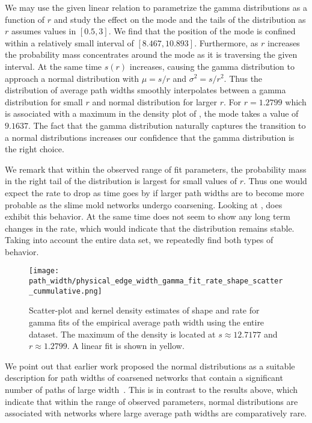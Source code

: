 		We may use the given linear relation to parametrize the gamma distributions as a function of $r$ and study the effect on the mode and the tails of the distribution as $r$ assumes values in $[0.5,3]$. We find that the position of the mode is confined within a relatively small interval of $[8.467,10.893]$. Furthermore, as $r$ increases the probability mass concentrates around the mode as it is traversing the given interval. At the same time $s(r)$ increases, causing the gamma distribution to approach a normal distribution with $\mu = s/r$ and $\sigma^2= s/r^2$. Thus the distribution of average path widths smoothly interpolates between a gamma distribution for small $r$ and normal distribution for larger $r$. For $r = 1.2799$ which is associated with a maximum in the density plot of , the mode takes a value of $9.1637$. The fact that the gamma distribution naturally captures the transition to a normal distributions increases our confidence that the gamma distribution is the right choice.

		We remark that within the observed range of fit parameters, the probability mass in the right tail of the distribution is largest for small values of $r$. Thus one would expect the rate to drop as time goes by if larger path widths are to become more probable as the slime mold networks undergo coarsening. Looking at ,  does exhibit this behavior. At the same time  does not seem to show any long term changes in the rate, which would indicate that the distribution remains stable. Taking into account the entire data set, we repeatedly find both types of behavior.

		\begin{figure}[!htbp]
			\centering
				\texttt{[image: path\_width/physical\_edge\_width\_gamma\_fit\_rate\_shape\_scatter\_cummulative.png]}
			\caption[Path width distribution fit parameter densities.]{Scatter-plot and kernel density estimates of shape and rate for gamma fits of the empirical average path width using the entire dataset. The maximum of the density is located at $s \approx 12.7177$ and $r \approx 1.2799$. A linear fit is shown in yellow.}
			\label{fig:path_widths_gamma_fit_kde}
		\end{figure}

		We point out that earlier work proposed the normal distributions as a suitable description for path widths of coarsened networks that contain a significant number of paths of large width~\cite{baumgarten2010plasmodial}. This is in contrast to the results above, which indicate that within the range of observed parameters, normal distributions are associated with networks where large average path widths are comparatively rare.

